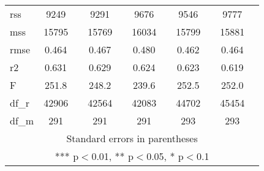 \documentclass[]{article}
\begin{document}
\begin{tabular}{lcccccccccc}
rss & 9249 &  & 9291 &  & 9676 &  & 9546 &  & 9777 &  \\
mss & 15795 &  & 15769 &  & 16034 &  & 15799 &  & 15881 &  \\
rmse & 0.464 &  & 0.467 &  & 0.480 &  & 0.462 &  & 0.464 &  \\
r2 & 0.631 &  & 0.629 &  & 0.624 &  & 0.623 &  & 0.619 &  \\
F & 251.8 &  & 248.2 &  & 239.6 &  & 252.5 &  & 252.0 &  \\
df\_r & 42906 &  & 42564 &  & 42083 &  & 44702 &  & 45454 &  \\
 df\_m & 291 &  & 291 &  & 291 &  & 293 &  & 293 &  \\ \hline
\multicolumn{11}{c}{ Standard errors in parentheses} \\
\multicolumn{11}{c}{ *** p$<$0.01, ** p$<$0.05, * p$<$0.1} \\
\end{tabular}
\end{document}

